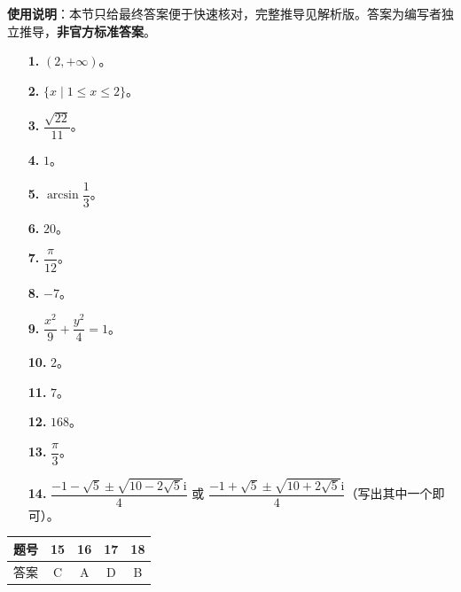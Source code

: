 
\begin{gknotice}
\textbf{使用说明}：本节只给最终答案便于快速核对，完整推导见解析版。答案为编写者独立推导，\textbf{非官方标准答案}。
\end{gknotice}

\begin{itemize}[leftmargin=2.6em]
  \item[\textbf{1.}] $(2,+\infty)$。
  \item[\textbf{2.}] $\{x\mid1\leqslant x\leqslant2\}$。
  \item[\textbf{3.}] $\dfrac{\sqrt{22}}{11}$。
  \item[\textbf{4.}] $1$。
  \item[\textbf{5.}] $\arcsin\dfrac13$。
  \item[\textbf{6.}] $20$。
  \item[\textbf{7.}] $\dfrac\pi{12}$。
  \item[\textbf{8.}] $-7$。
  \item[\textbf{9.}] $\dfrac{x^2}9+\dfrac{y^2}4=1$。
  \item[\textbf{10.}] $2$。
  \item[\textbf{11.}] $7$。
  \item[\textbf{12.}] $168$。
  \item[\textbf{13.}] $\dfrac\pi3$。
  \item[\textbf{14.}] $\dfrac{-1-\sqrt5\pm\sqrt{10-2\sqrt5}\mathrm i}4$ 或 $\dfrac{-1+\sqrt5\pm\sqrt{10+2\sqrt5}\mathrm i}4$（写出其中一个即可）。
\end{itemize}

\begin{center}\begin{tabular}{ccccc}
\toprule
题号 & 15 & 16 & 17 & 18 \\
\midrule
答案 & C & A & D & B \\
\bottomrule
\end{tabular}\end{center}

